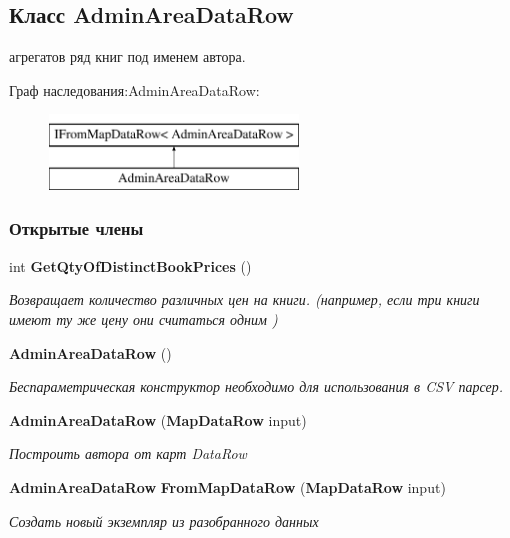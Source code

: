 \subsection{Класс Admin\+Area\+Data\+Row}
\label{classkdz__manager_1_1_admin_area_data_row}


агрегатов ряд книг под именем автора.  


Граф наследования\+:Admin\+Area\+Data\+Row\+:\begin{figure}[H]
\begin{center}
\leavevmode
\includegraphics[height=2.000000cm]{classkdz__manager_1_1_admin_area_data_row}
\end{center}
\end{figure}
\subsubsection*{Открытые члены}
\begin{DoxyCompactItemize}
\item 
int {\bf Get\+Qty\+Of\+Distinct\+Book\+Prices} ()
\begin{DoxyCompactList}\small\item\em Возвращает количество различных цен на книги. (например, если три книги имеют ту же цену они считаться одним ) \end{DoxyCompactList}\item 
{\bf Admin\+Area\+Data\+Row} ()
\begin{DoxyCompactList}\small\item\em Беспараметрическая конструктор необходимо для использования в C\+S\+V парсер. \end{DoxyCompactList}\item 
{\bf Admin\+Area\+Data\+Row} ({\bf Map\+Data\+Row} input)
\begin{DoxyCompactList}\small\item\em Построить автора от карт Data\+Row \end{DoxyCompactList}\item 
{\bf Admin\+Area\+Data\+Row} {\bf From\+Map\+Data\+Row} ({\bf Map\+Data\+Row} input)
\begin{DoxyCompactList}\small\item\em Создать новый экземпляр из разобранного данных \end{DoxyCompactList}\end{DoxyCompactItemize}
